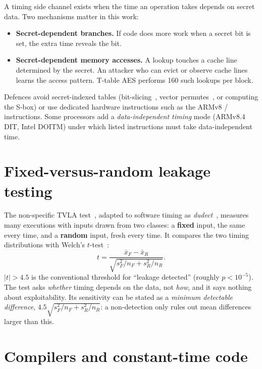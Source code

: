 A timing side channel exists when the time an operation takes depends on secret data. Two mechanisms matter in this work:

\begin{itemize}
  \item \textbf{Secret-dependent branches.} If code does more work when a secret bit is set, the extra time reveals the bit.
  \item \textbf{Secret-dependent memory accesses.} A lookup  touches a cache line determined by the secret. An attacker who can evict or observe cache lines learns the access pattern. T-table AES performs 160 such lookups per block.
\end{itemize}

Defences avoid secret-indexed tables (bit-slicing~\cite{kasper09}, vector permutes~\cite{hamburg09}, or computing the S-box) or use dedicated hardware instructions such as the ARMv8 / instructions. Some processors add a \emph{data-independent timing} mode (ARMv8.4 DIT, Intel DOITM) under which listed instructions must take data-independent time.

\section{Fixed-versus-random leakage testing}

The non-specific TVLA test~\cite{tvla}, adapted to software timing as \emph{dudect}~\cite{dudect}, measures many executions with inputs drawn from two classes: a \textbf{fixed} input, the same every time, and a \textbf{random} input, fresh every time. It compares the two timing distributions with Welch's $t$-test~\cite{welch47}:
\begin{equation}
t = \frac{\bar x_F - \bar x_R}{\sqrt{s_F^2/n_F + s_R^2/n_R}}.
\label{eq:welch}
\end{equation}
$\lvert t\rvert > 4.5$ is the conventional threshold for ``leakage detected'' (roughly $p < 10^{-5}$). The test asks \emph{whether} timing depends on the data, not \emph{how}, and it says nothing about exploitability. Its sensitivity can be stated as a \emph{minimum detectable difference}, $4.5\sqrt{s_F^2/n_F + s_R^2/n_R}$: a non-detection only rules out mean differences larger than this.

\section{Compilers and constant-time code}

